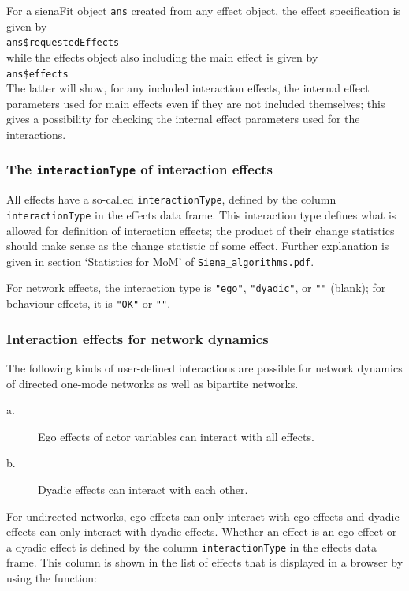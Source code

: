 \documentclass[a4paper,fleqn,11pt]{article}
\newcommand{\+}{\, + \,}
\newcommand{\sfn}[1]{\textsf{#1}}
\begin{document}
For a \sfn{sienaFit} object \texttt{ans} created from any effect object,
the effect specification is given by\\[0.3em]
\texttt{ans\$requestedEffects}\\[0.3em]
while the effects object also including the main effect is given by\\[0.3em]
\texttt{ans\$effects}\\[0.3em]
The latter will show, for any included interaction effects,
the internal effect parameters used for main effects
even if they are not included themselves; this gives
a possibility for checking the internal effect parameters
used for the interactions.


\subsubsection{The \texttt{interactionType} of interaction effects}

All effects have a so-called  \texttt{interactionType},
defined by the column \texttt{interactionType} in the effects data frame.
This interaction type defines what is allowed for  definition of interaction effects;
the product of their change statistics should make sense as the change
statistic of some effect.
Further explanation is given in section `Statistics for MoM' of
\href{http://www.stats.ox.ac.uk/~snijders/siena/Siena_algorithms.pdf}{\texttt{Siena\_algorithms.pdf}}.

For network effects, the interaction type is \texttt{"ego"}, \texttt{"dyadic"},
or \texttt{""} (blank);
for behaviour effects, it is \texttt{"OK"} or \texttt{""}.


\subsubsection{Interaction effects for network dynamics}

The following kinds of user-defined interactions are possible
for network dynamics of directed one-mode networks
as well as bipartite networks.
\begin{description}
\item[a.]
  Ego effects of actor variables can interact with all effects.
  \item[b.] Dyadic effects can interact with each other.
\end{description}
For undirected networks, ego effects can only interact with ego effects and
dyadic effects can only interact with dyadic effects.
Whether an effect is an ego effect or a dyadic effect is defined by
the column \texttt{interactionType} in the effects data frame.
This column is shown in the list of effects that is displayed
in a browser by using the function:
\end{document}
